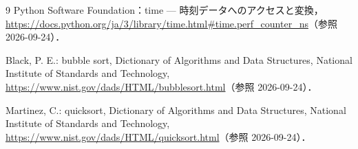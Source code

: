 \begin{thebibliography}{9}
Python Software Foundation：time --- 時刻データへのアクセスと変換，\url{https://docs.python.org/ja/3/library/time.html#time.perf_counter_ns}（参照 2026-09-24）．

Black, P. E.: bubble sort, Dictionary of Algorithms and Data Structures, National Institute of Standards and Technology, \url{https://www.nist.gov/dads/HTML/bubblesort.html}（参照 2026-09-24）．

Martinez, C.: quicksort, Dictionary of Algorithms and Data Structures, National Institute of Standards and Technology, \url{https://www.nist.gov/dads/HTML/quicksort.html}（参照 2026-09-24）．
\end{thebibliography}
